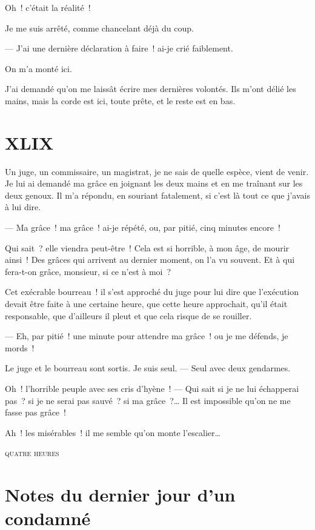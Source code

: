 \documentclass[french,twoside]{book} %
\begin{document}
Oh ! c’était la réalité !\par
Je me suis arrêté, comme chancelant déjà du coup.\par
— J’ai une dernière déclaration à faire ! ai-je crié faiblement.\par
On m’a monté ici.\par
J’ai demandé qu’on me laissât écrire mes dernières volontés. Ils m’ont délié les mains, mais la corde est ici, toute prête, et le reste est en bas.
 \section[{XLIX}]{XLIX}
\label{ch49}\renewcommand{\leftmark}{XLIX}

\noindent Un juge, un commissaire, un magistrat, je ne sais de quelle espèce, vient de venir. Je lui ai demandé ma grâce en joignant les deux mains et en me traînant sur les deux genoux. Il m’a répondu, en souriant fatalement, si c’est là tout ce que j’avais à lui dire.\par
— Ma grâce ! ma grâce ! ai-je répété, ou, par pitié, cinq minutes encore !\par
Qui sait ? elle viendra peut-être ! Cela est si horrible, à mon âge, de mourir ainsi ! Des grâces qui arrivent au dernier moment, on l’a vu souvent. Et à qui fera-t-on grâce, monsieur, si ce n’est à moi ?\par
Cet exécrable bourreau ! il s’est approché du juge pour lui dire que l’exécution devait être faite à une certaine heure, que cette heure approchait, qu’il était responsable, que d’ailleurs il pleut et que cela risque de se rouiller.\par
— Eh, par pitié ! une minute pour attendre ma grâce ! ou je me défends, je mords !\par
 Le juge et le bourreau sont sortis. Je suis seul. — Seul avec deux gendarmes.\par
Oh ! l’horrible peuple avec ses cris d’hyène ! — Qui sait si je ne lui échapperai pas ? si je ne serai pas sauvé ? si ma grâce ?… Il est impossible qu’on ne me fasse pas grâce !\par
Ah ! les misérables ! il me semble qu’on monte l’escalier…\par
\bigbreak

\begin{center}
\noindent \centerline{{\scshape quatre heures}}\par
\end{center}

  \section[{Notes du dernier jour d’un condamné}]{Notes du dernier jour d’un condamné}
\label{notes}\renewcommand{\leftmark}{Notes du dernier jour d’un condamné}
\end{document}
